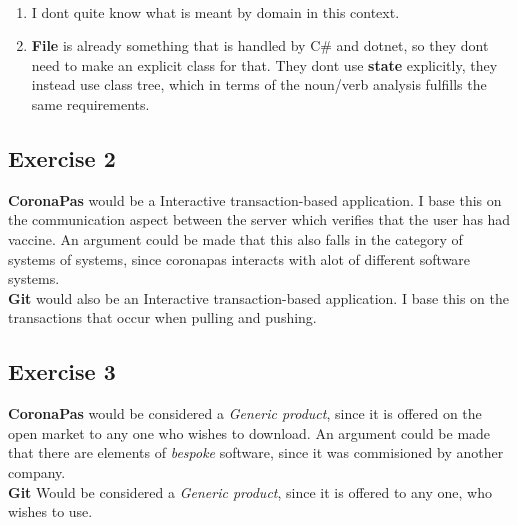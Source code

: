 \documentclass{article}
\begin{document}
\\
\begin{enumerate}
    \item I dont quite know what is meant by domain in this context.
    \item \textbf{File} is already something that is handled by C\# and dotnet, so they dont need to make an explicit class for that. They dont use \textbf{state} explicitly, they instead use class tree, which in terms of the noun/verb analysis fulfills the same requirements. 
\end{enumerate}
\subsection*{Exercise 2}
\textbf{CoronaPas} would be a Interactive transaction-based application. I base this on the communication aspect between the server which verifies that the user has had vaccine. An argument could be made that this also falls in the category of systems of systems, since coronapas interacts with alot of different software systems. 
\\
\textbf{Git} would also be an Interactive transaction-based application. I base this on the transactions that occur when pulling and pushing. 
\subsection*{Exercise 3} 
\textbf{CoronaPas} would be considered a \textit{Generic product}, since it is offered on the open market to any one who wishes to download. An argument could be made that there are elements of \textit{bespoke} software, since it was commisioned by another company.
\\
\textbf{Git} Would be considered a \textit{Generic product}, since it is offered to any one, who wishes to use.
\end{document}
